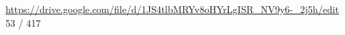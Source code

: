 \vspace{4cm}
\url{https://drive.google.com/file/d/1JS4tlbMRYv8oHYrLgISR_NV9y6-_2j5h/edit}\\
53 / 417


















































































































